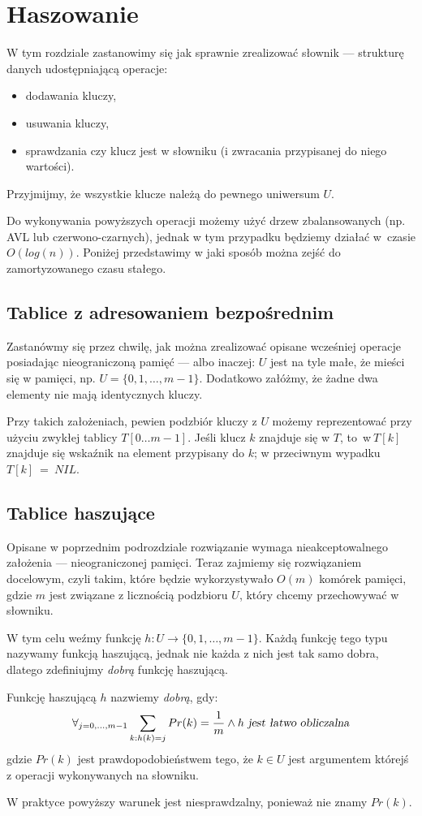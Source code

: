 \section{Haszowanie}

W tym rozdziale zastanowimy się jak sprawnie zrealizować słownik --- strukturę danych udostępniającą operacje: 
\begin{itemize}
	\item dodawania kluczy,
	\item usuwania kluczy,
	\item sprawdzania czy klucz jest w słowniku (i zwracania przypisanej do niego wartości).
\end{itemize}
Przyjmijmy, że wszystkie klucze należą do pewnego uniwersum $U$.

Do wykonywania powyższych operacji możemy użyć drzew zbalansowanych (np. AVL lub czerwono-czarnych), jednak w tym przypadku będziemy działać w~czasie $O(log(n))$. Poniżej przedstawimy w jaki sposób można zejść do zamortyzowanego czasu stałego.

\subsection{Tablice z adresowaniem bezpośrednim}
Zastanówmy się przez chwilę, jak można zrealizować opisane wcześniej operacje posiadając nieograniczoną pamięć --- albo inaczej: $U$ jest na tyle małe, że mieści się w pamięci, np. $U = \{0, 1, \dots, m - 1\}$.
Dodatkowo załóżmy, że żadne dwa elementy nie mają identycznych kluczy.

Przy takich założeniach, pewien podzbiór kluczy z $U$ możemy reprezentować przy użyciu zwykłej tablicy $T[0 \dots m - 1]$.
Jeśli klucz $k$ znajduje się w $T$, to~w$~T[k]$ znajduje się wskaźnik na element przypisany do $k$; w przeciwnym wypadku $T[k]~=~NIL$.

\subsection{Tablice haszujące}
Opisane w poprzednim podrozdziale rozwiązanie wymaga nieakceptowalnego założenia --- nieograniczonej pamięci. Teraz zajmiemy się rozwiązaniem docelowym, czyli takim, które będzie wykorzystywało $O(m)$ komórek pamięci, gdzie $m$ jest związane z licznością podzbioru $U$, który chcemy przechowywać w słowniku.

W tym celu weźmy funkcję $h : U \rightarrow \{0, 1, \dots, m - 1\}$.
Każdą funkcję tego typu nazywamy funkcją haszującą, jednak nie każda z nich jest tak samo dobra, dlatego zdefiniujmy \textit{dobrą} funkcję haszującą.
\begin{definition}
	\label{dobra_funkcja_haszujaca}
	Funkcję haszującą $h$ nazwiemy \textit{dobrą}, gdy:
	\begin{equation*}
		\forall_{j = 0, \dots, m - 1} \sum_{k : h(k) = j} Pr(k) = \dfrac{1}{m} \wedge h \textsl{ jest łatwo obliczalna}
	\end{equation*}
	gdzie $Pr(k)$ jest prawdopodobieństwem tego, że $k \in U$ jest argumentem którejś z operacji wykonywanych na słowniku.
\end{definition}
W praktyce powyższy warunek jest niesprawdzalny, ponieważ nie znamy $Pr(k)$.

